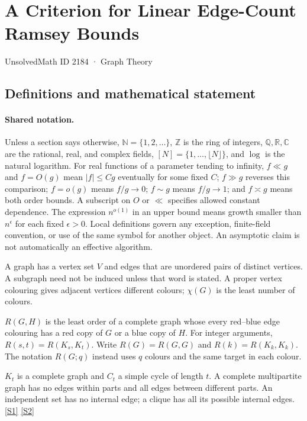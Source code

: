 \documentclass[11pt,a4paper]{article}
\newcommand{\N}{\mathbb{N}}
\newcommand{\Z}{\mathbb{Z}}
\newcommand{\Q}{\mathbb{Q}}
\newcommand{\R}{\mathbb{R}}
\newcommand{\C}{\mathbb{C}}
\newcommand{\sref}[2]{\hyperlink{source:#1:#2}{[S#2]}}
\begin{document}

\setcounter{section}{2183}

\section{A Criterion for Linear Edge-Count Ramsey Bounds}\label{2184}

{\small\sffamily UnsolvedMath ID 2184 · Graph Theory}

\subsection{Definitions and mathematical statement}

\paragraph{Shared notation.}Unless a section says otherwise, $\N=\{1,2,\ldots\}$,
$\Z$ is the ring of integers, $\Q,\R,\C$ are the rational, real, and complex
fields, $[N]=\{1,\ldots,\lfloor N\rfloor\}$, and $\log$ is the natural
logarithm. For real functions of a parameter tending to infinity,
$f\ll g$ and $f=O(g)$ mean $|f|\leq Cg$ eventually for some fixed $C$;
$f\gg g$ reverses this comparison; $f=o(g)$ means $f/g\to0$;
$f\sim g$ means $f/g\to1$; and $f\asymp g$ means both order bounds.
A subscript on $O$ or $\ll$ specifies allowed constant dependence.
The expression $n^{o(1)}$ in an upper bound means growth smaller than
$n^\epsilon$ for each fixed $\epsilon>0$. Local definitions govern any
exception, finite-field convention, or use of the same symbol for another
object. An asymptotic claim is not automatically an effective algorithm.



A graph has a vertex set $V$ and edges that are unordered pairs of distinct vertices. A subgraph need not be induced unless that word is stated. A proper vertex colouring gives adjacent vertices different colours; $\chi(G)$ is the least number of colours.

$R(G,H)$ is the least order of a complete graph whose every red--blue edge colouring has a red copy of $G$ or a blue copy of $H$. For integer arguments, $R(s,t)=R(K_s,K_t)$. Write $R(G)=R(G,G)$ and $R(k)=R(K_k,K_k)$. The notation $R(G;q)$ instead uses $q$ colours and the same target in each colour.

$K_t$ is a complete graph and $C_t$ a simple cycle of length $t$. A complete multipartite graph has no edges within parts and all edges between different parts. An independent set has no internal edge; a clique has all its possible internal edges. \sref{2184}{1} \sref{2184}{2}
\end{document}
